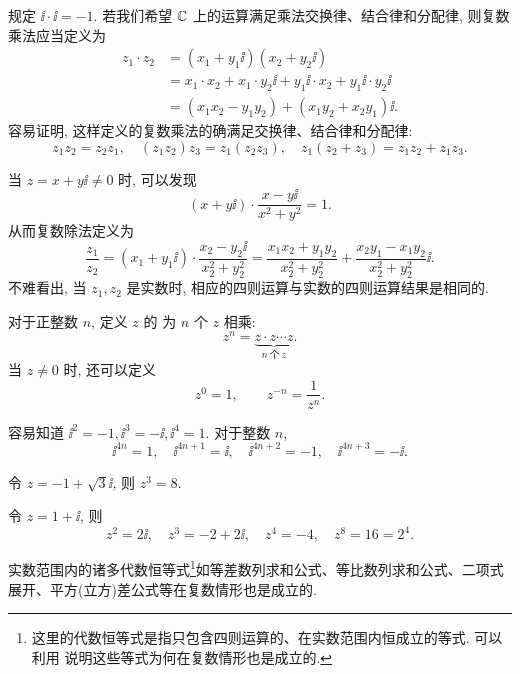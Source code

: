 \alert{规定 $\ii\cdot \ii=-1$}.
若我们希望 ${\mathbb{C}}$ 上的运算满足乘法交换律、结合律和分配律, 则复数乘法应当定义为
\begin{align*}
   z_1\cdot z_2&
  =(x_1+y_1\ii)(x_2+y_2\ii)\\&
  =x_1\cdot x_2+x_1\cdot y_2\ii+y_1\ii\cdot x_2+y_1\ii\cdot y_2\ii\\&
  =(x_1x_2-y_1y_2)+(x_1y_2+x_2y_1)\ii.
\end{align*}
容易证明, 这样定义的复数乘法的确满足交换律、结合律和分配律:
\[
  z_1z_2=z_2z_1,\quad
  (z_1z_2) z_3=z_1(z_2 z_3),\quad
  z_1(z_2+z_3)=z_1z_2+z_1z_3.
\]


当 $z=x+y\ii\neq0$ 时, 可以发现
\[
  (x+y\ii)\cdot\frac{x-y\ii}{x^2+y^2}=1.
\]
从而复数除法定义为
\[
   \frac{z_1}{z_2}
  =(x_1+y_1\ii)\cdot\frac{x_2-y_2\ii}{x_2^2+y_2^2}
  =\frac{x_1x_2+y_1y_2}{x_2^2+y_2^2}+\frac{x_2y_1-x_1y_2}{x_2^2+y_2^2}\ii.
\]
不难看出, 当 $z_1,z_2$ 是实数时, 相应的四则运算与实数的四则运算结果是相同的.

对于正整数 $n$, 定义 $z$ 的 为 $n$ 个 $z$ 相乘:
\[
  z^n=\underbrace{z\cdot z\cdots z}_{n\ \text{个}\ z}.
\]
当 $z\neq 0$ 时, 还可以定义
\[
  z^0=1,\qquad
  z^{-n}=\frac1{z^n}.
\]

\begin{exampleenum}
  \item 容易知道 $\ii^2=-1,\ii^3=-\ii,\ii^4=1$.
  对于整数 $n$, 
  \[
    \ii^{4n}=1,\quad 
    \ii^{4n+1}=\ii,\quad 
    \ii^{4n+2}=-1,\quad 
    \ii^{4n+3}=-\ii.
  \]
  \item 令 $z=-1+\sqrt 3\ii$, 则 $z^3=8$.
  \item 令 $z=1+\ii$, 则
  \[
    z^2=2\ii,\quad 
    z^3=-2+2\ii,\quad 
    z^4=-4,\quad 
    z^8=16=2^4.
  \]
\end{exampleenum}

实数范围内的诸多代数恒等式\footnote{
  这里的代数恒等式是指只包含四则运算的、在实数范围内恒成立的等式.
  可以利用 说明这些等式为何在复数情形也是成立的.
}如等差数列求和公式、等比数列求和公式、二项式展开、平方(立方)差公式等在复数情形也是成立的.


